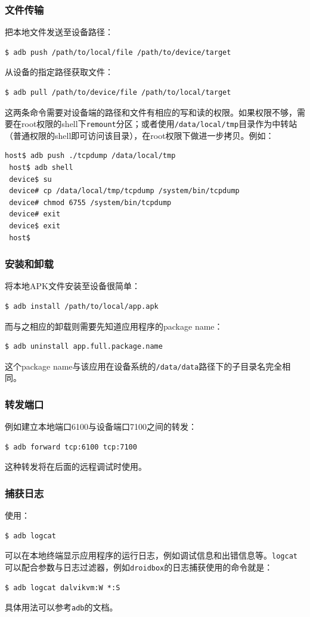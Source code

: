 \subsubsection{文件传输}
把本地文件发送至设备路径：
\begin{lstlisting}[numbers=none]
 $ adb push /path/to/local/file /path/to/device/target
\end{lstlisting}

从设备的指定路径获取文件：
\begin{lstlisting}[numbers=none]
 $ adb pull /path/to/device/file /path/to/local/target
\end{lstlisting}
这两条命令需要对设备端的路径和文件有相应的写和读的权限。如果权限不够，需要在root权限的shell下\lstinline!remount!分区；或者使用\lstinline!/data/local/tmp!目录作为中转站（普通权限的shell即可访问该目录），在root权限下做进一步拷贝。例如：
\begin{lstlisting}[numbers=none]
 host$ adb push ./tcpdump /data/local/tmp
 host$ adb shell
 device$ su
 device# cp /data/local/tmp/tcpdump /system/bin/tcpdump
 device# chmod 6755 /system/bin/tcpdump
 device# exit
 device$ exit
 host$
\end{lstlisting}

\subsubsection{安装和卸载}
将本地APK文件安装至设备很简单：
\begin{lstlisting}[numbers=none]
 $ adb install /path/to/local/app.apk
\end{lstlisting}

而与之相应的卸载则需要先知道应用程序的package name：
\begin{lstlisting}[language=bash, numbers=none]
 $ adb uninstall app.full.package.name
\end{lstlisting}
这个package name与该应用在设备系统的\lstinline!/data/data!路径下的子目录名完全相同。

\subsubsection{转发端口}
例如建立本地端口6100与设备端口7100之间的转发：
\begin{lstlisting}[numbers=none]
 $ adb forward tcp:6100 tcp:7100
\end{lstlisting}
这种转发将在后面的远程调试时使用。

\subsubsection{捕获日志}
使用：
\begin{lstlisting}[numbers=none]
 $ adb logcat
\end{lstlisting}
可以在本地终端显示应用程序的运行日志，例如调试信息和出错信息等。\lstinline!logcat!可以配合参数与日志过滤器，例如\lstinline!droidbox!的日志捕获使用的命令就是：
\begin{lstlisting}[numbers=none]
 $ adb logcat dalvikvm:W *:S
\end{lstlisting}
具体用法可以参考\lstinline!adb!的文档。

